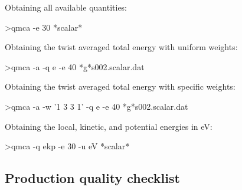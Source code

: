 \noindent
Obtaining all available quantities:
\begin{shade}
>qmca -e 30 *scalar*
\end{shade}
\noindent
Obtaining the twist averaged total energy with uniform weights:
\begin{shade}
>qmca -a -q e -e 40 *g*s002.scalar.dat
\end{shade}
\noindent
Obtaining the twist averaged total energy with specific weights:
\begin{shade}
>qmca -a -w '1 3 3 1' -q e -e 40 *g*s002.scalar.dat
\end{shade}
\noindent
Obtaining the local, kinetic, and potential energies in eV:
\begin{shade}
>qmca -q ekp -e 30 -u eV *scalar*
\end{shade}



\subsection{Production quality checklist}
\label{sec:qmca_production_checklist}

